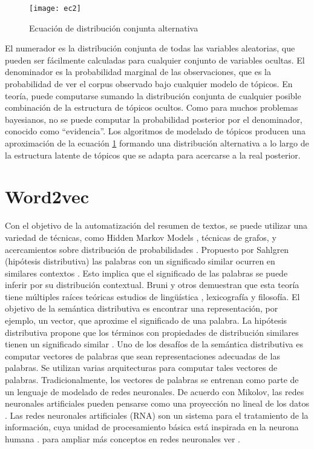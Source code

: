 \begin{figure}[H]
\texttt{[image: ec2]}
\caption{Ecuación de distribución conjunta alternativa \cite{DescubrimientoPatrones}}
\label{ecuacion2}
\end{figure}

El numerador es la distribución conjunta de todas las variables aleatorias, que pueden
ser fácilmente calculadas para cualquier conjunto de variables ocultas. El denominador
es la probabilidad marginal de las observaciones, que es la probabilidad de ver
el corpus observado bajo cualquier modelo de tópicos. En teoría, puede computarse
sumando la distribución conjunta de cualquier posible combinación de la estructura
de tópicos ocultos. Como para muchos problemas bayesianos, no se puede computar la
probabilidad posterior por el denominador, conocido como “evidencia”. Los algoritmos
de modelado de tópicos producen una aproximación de la ecuación \ref{ecuacion2} formando una
distribución alternativa a lo largo de la estructura latente de tópicos que se adapta para
acercarse a la real posterior.


\section{Word2vec}

Con el objetivo de la automatización del resumen de textos, se puede utilizar una
variedad de técnicas, como Hidden Markov Models , técnicas de grafos, y acercamientos
sobre distribución de probabilidades \cite{heuer2015semantic}. Propuesto por Sahlgren \cite{sahlgren2005methods} (hipótesis distributiva) las palabras con un significado similar
ocurren en similares contextos . Esto implica que el significado de las palabras se
puede inferir por su distribución contextual. Bruni y otros \cite{bruni2014multimodal} demuestran
que esta teoría tiene múltiples raíces teóricas estudios de lingüística , lexicografía
y filosofía. El objetivo de la semántica distributiva es encontrar una representación, por
ejemplo, un vector, que aproxime el significado de una palabra. La hipótesis distributiva
propone que los términos con propiedades de distribución similares tienen un significado
similar \cite{sahlgren2005methods}.
Uno de los desafíos de la semántica distributiva es computar vectores de palabras
que sean representaciones adecuadas de las palabras. Se utilizan varias arquitecturas
para computar tales vectores de palabras. Tradicionalmente, los vectores de palabras
se entrenan como parte de un lenguaje de modelado de redes neuronales. De acuerdo
con Mikolov, las redes neuronales artificiales pueden pensarse como una proyección
no lineal de los datos \cite{mikolov2013efficient}. Las redes neuronales artificiales (RNA)
son un sistema para el tratamiento de la información, cuya unidad de procesamiento
básica está inspirada en la neurona humana \cite{de1998aplicacion}. para ampliar más conceptos en redes neuronales ver 
\cite{rajasekaran2003neural}.


